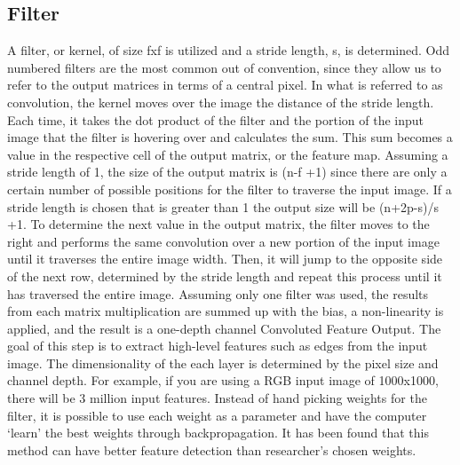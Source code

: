 \documentclass[10pt,twocolumn]{article}
\begin{document}
\subsection{Filter}
A filter, or kernel, of size fxf is utilized and a stride length, s, is determined. Odd numbered filters are the most common out of convention, since they allow us to refer to the output matrices in terms of a central pixel. In what is referred to as convolution, the kernel moves over the image the distance of the stride length. Each time, it takes the dot product of  the filter and the portion of the input image that the filter is hovering over and calculates the sum. This sum becomes a value in the respective cell of the output matrix, or the feature map. Assuming a stride length of 1, the size of the output matrix is (n-f +1) since there are only a certain number of possible positions for the filter to traverse the input image. If a stride length is chosen that is greater than 1 the output size will be (n+2p-s)/s +1. To determine the next value in the output matrix, the filter moves to the right and performs the same convolution over a new portion of the input image until it traverses the entire image width. Then, it will jump to the opposite side of the next row, determined by the stride length and repeat this process until it has traversed the entire image. Assuming only one filter was used, the results from each matrix multiplication are summed up with the bias, a non-linearity is applied, and the result is a one-depth channel Convoluted Feature Output. The goal of this step is to extract high-level features such as edges from the input image. The dimensionality of the each layer is determined by the pixel size and channel depth. For example, if you are using a RGB input image of 1000x1000, there will be 3 million input features. Instead of hand picking weights for the filter, it is possible to use each weight as a parameter and have the computer ‘learn’ the best weights through backpropagation. It has been found that this method can have better feature detection than researcher’s chosen weights. 
\end{document}
